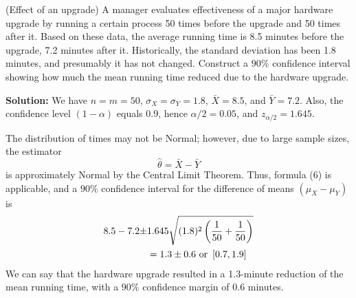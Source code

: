 \begin{example}{ (Effect of an upgrade)}
  A manager evaluates effectiveness of a major hardware upgrade by running a certain process 50 times before the upgrade and 50 times after it. Based on these data, the average running time is 8.5 minutes before the upgrade, 7.2 minutes after it. Historically, the standard deviation has been 1.8 minutes, and presumably it has not changed. Construct a $90\%$ confidence interval showing how much the mean running time reduced due to the hardware upgrade.

  \textbf{Solution:}
  We have $n = m = 50$, $\sigma_X = \sigma_Y = 1.8$, $\bar{X} = 8.5$, and $\bar{Y} = 7.2$. Also, the confidence level $(1 - \alpha)$ equals 0.9, hence $\alpha / 2 = 0.05$, and $z_{\alpha/2} = 1.645$.

  The distribution of times may not be Normal; however, due to large sample sizes, the estimator 
  \begin{equation*}
    \hat{\theta} = \bar{X} - \bar{Y}
  \end{equation*}
  is approximately Normal by the Central Limit Theorem. Thus, formula (6) is applicable, and a $90\%$ confidence interval for the difference of means $(\mu_X - \mu_Y)$ is
  \begin{align*}
    8.5 - 7.2 \pm &1.645 \sqrt{(1.8)^2 \left(\frac{1}{50} + \frac{1}{50}\right)}\\
    &= 1.3 \pm 0.6 \textnormal{ or } \left[ 0.7, 1.9 \right]
  \end{align*}
  We can say that the hardware upgrade resulted in a 1.3-minute reduction of the mean running time, with a $90\%$ confidence margin of 0.6 minutes.
\end{example}

\newpage
